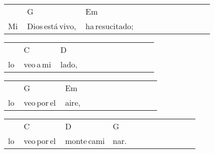 \begin{multicols}{2}
\begin{minipage}{\columnwidth}
\noindent
\begin{tabular}{llllllllllll}
&G&Em\\
Mi\,&Dios\,está\,vivo,\,&ha\,resucitado;
\end{tabular}

\noindent
\begin{tabular}{llllllllllll}
&C&D\\
lo\,&veo\,a\,mi\,&lado,
\end{tabular}

\noindent
\begin{tabular}{llllllllllll}
&G&Em\\
lo\,&veo\,por\,el\,&aire,
\end{tabular}

\noindent
\begin{tabular}{llllllllllll}
&C&D&G\\
lo\,&veo\,por\,el\,&monte\,cami&nar.
\end{tabular}
\end{minipage}\\


\chorus{}

\end{multicols}